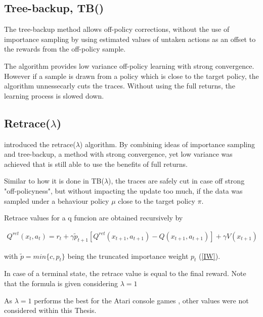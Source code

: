 \subsection{Tree-backup, TB(\lambda)}

The tree-backup method allows off-policy corrections, without the use of importance sampling by using estimated values of untaken actions as an offset to the rewards from the off-policy sample. \citet{Precup00}

The algorithm provides low variance off-policy learning with strong convergence.
However if a sample is drawn from a policy which is close to the target policy, the algorithm unnessecarly cuts the traces. Without using the full returns, the learning process is slowed down.
\pagebreak
\subsection{Retrace($\lambda$)}

\citet{Munos16} introduced the retrace($\lambda$) algorithm. By combining ideas of importance sampling and tree-backup, a method with strong convergence, yet low variance was achieved that is still able to use the benefits of full returns.

Similar to how it is done in TB($\lambda$), the traces are safely cut in case off strong "off-policyness", but without impacting the update too much, if the data was sampled under a behaviour policy $\mu$ close to the target policy $\pi$.

Retrace values for a q funcion are obtained recursively by

\begin{align}
{
Q^{ret}(x_t,a_t)=r_t+\gamma \tilde{p}_{t+1} [Q^{ret}(x_{t+1},a_{t+1} ) -  Q(x_{t+1},a_{t+1})] + \gamma V(x_{t+1})
}
\label{qretrace}
\end{align}

with $\tilde{p} = min\{c,p_t\}$ being the truncated importance weight $p_t$ (\ref{IW}).

In case of a terminal state, the retrace value is equal to the final reward.
Note that the formula is given considering $\lambda = 1$

As $\lambda = 1$ performs the best for the Atari console games \citep{Munos16}, other values were not considered within this Thesis.

\pagebreak
